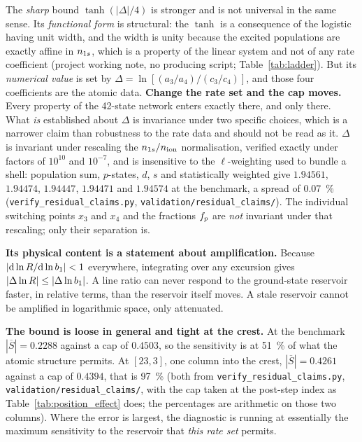 The \emph{sharp} bound $\tanh(|\Delta|/4)$ is stronger and is not universal in
the same sense. Its \emph{functional form} is structural: the $\tanh$ is a
consequence of the logistic having unit width, and the width is unity because
the excited populations are exactly affine in $n_{1s}$, which is a property of the
linear system and not of any rate coefficient
(project working note, no producing script; Table~\ref{tab:ladder}). But its \emph{numerical value} is set by
$\Delta = \ln[(a_3/a_4)/(c_3/c_4)]$, and those four coefficients are the atomic
data. \textbf{Change the rate set and the cap moves.} Every property of the
42-state network enters exactly there, and only there.
What \emph{is} established about $\Delta$ is invariance under two specific
choices, which is a narrower claim than robustness to the rate data and should
not be read as it. $\Delta$ is invariant under rescaling the $n_{1s}/n_{\mathrm{ion}}$
normalisation, verified exactly under factors of $10^{10}$ and $10^{-7}$, and is
insensitive to the $\ell$-weighting used to bundle a shell: population sum,
$p$-states, $d$, $s$ and statistically weighted give $1.94561$, $1.94474$,
$1.94447$, $1.94471$ and $1.94574$ at the benchmark, a spread of
\SI{0.07}{\percent} (\texttt{verify\_residual\_claims.py},
\texttt{validation/residual\_claims/}). The individual switching
points $x_3$ and $x_4$ and the fractions $f_{p}$ are \emph{not} invariant
under that rescaling; only their separation is.

\textbf{Its physical content is a statement about amplification.} Because
$|\mathrm{d}\ln R/\mathrm{d}\ln b_1| < 1$ everywhere, integrating over any
excursion gives $|\Delta\ln R| \le |\Delta\ln b_1|$. A line ratio can never
respond to the ground-state reservoir faster, in relative terms, than the
reservoir itself moves. A stale reservoir cannot be amplified in logarithmic
space, only attenuated.

\textbf{The bound is loose in general and tight at the crest.} At the benchmark
$|\overline{S}| = 0.2288$ against a cap of $0.4503$, so the sensitivity is at
\SI{51}{\percent} of what the atomic structure permits. At $[23,3]$, one column
into the crest, $|\overline{S}| = 0.4261$ against a cap of $0.4394$, that is
\SI{97}{\percent} (both from \texttt{verify\_residual\_claims.py},
\texttt{validation/residual\_claims/}, with the cap taken at the post-step index
as Table~\ref{tab:position_effect} does; the percentages are arithmetic on those
two columns). Where the error is
largest, the diagnostic is running at essentially the maximum sensitivity to the
reservoir that \emph{this rate set} permits.


